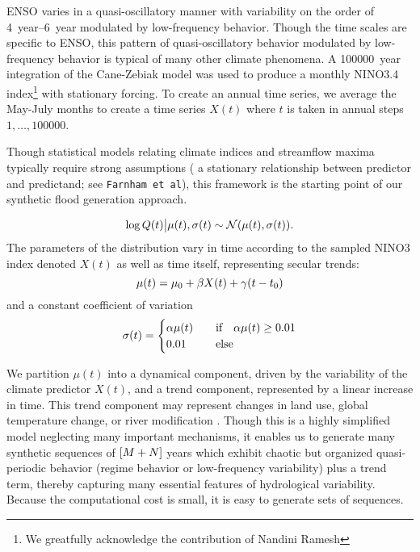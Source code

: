 \documentclass[11pt]{article}
\begin{document}
ENSO \citep[see][for a comprehensive review]{Sarachik2010} varies in a quasi-oscillatory manner with variability on the order of \SIrange{4}{6}{year} modulated by low-frequency behavior.
Though the time scales are specific to ENSO, this pattern of quasi-oscillatory behavior modulated by low-frequency behavior is typical of many other climate phenomena.
A \SI{100000}{year} integration of the Cane-Zebiak model \citep{Zebiak1987} was used to produce a monthly NINO3.4 index\footnote{We greatfully acknowledge the contribution of Nandini Ramesh} with stationary forcing.
To create an annual time series, we average the May-July months to create a time series \( X(t) \) where \(t\) is taken in annual steps \(1, \ldots, \num{100000}\).

Though statistical models relating climate indices and streamflow maxima typically require strong assumptions (\ie{} a stationary relationship between predictor and predictand; see \texttt{Farnham et al}), this framework is the starting point of our synthetic flood generation approach.

\begin{equation} \label{eq:lognormal}
  \log Q(t) \big| \mu(t),\sigma(t) \sim \mathcal{N} \qty(\mu(t), \sigma(t)).
\end{equation}
The parameters of the distribution vary in time according to the sampled NINO3 index denoted \( X(t) \) as well as time itself, representing secular trends:
\begin{equation}
  \mu(t) = \mu_0 + \beta X(t) + \gamma \qty(t - t_0)
\end{equation}
and a constant coefficient of variation
\begin{equation}
  \sigma(t) = \begin{cases} \alpha \mu(t) & \qqtext{if} \alpha \mu(t) \geq 0.01 \\ 0.01 & \qqtext{else} \end{cases}
\end{equation}

We partition \( \mu(t) \) into a dynamical component, driven by the variability of the climate predictor \(X(t)\), and a trend component, represented by a linear increase in time.
This trend component may represent changes in land use, global temperature change, or river modification \citep[see][]{Merz2014}.
Though this is a highly simplified model neglecting many important mechanisms, it enables us to generate many synthetic sequences of \(\qty[M + N]\) years which exhibit chaotic but organized quasi-periodic behavior (regime behavior or low-frequency variability) plus a trend term, thereby capturing many essential features of hydrological variability.
Because the computational cost is small, it is easy to generate sets of sequences.
\end{document}
